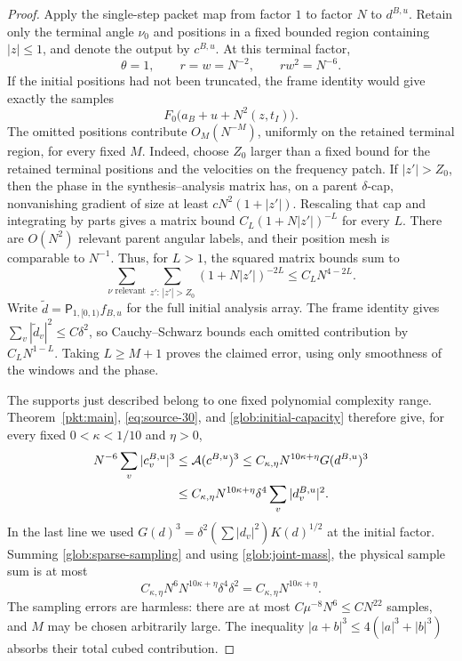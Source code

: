 \begin{proof}
Apply the single-step packet map from factor $1$ to factor $N$ to
$d^{B,u}$. Retain only the terminal angle $\nu_0$ and positions in a
fixed bounded region containing $|z|\le1$, and denote the output by
$c^{B,u}$. At this terminal factor,
\[
       \theta=1,\qquad r=w=N^{-2},\qquad rw^2=N^{-6}.
\]
If the initial positions had not been truncated, the frame identity
would give exactly the samples
\[
       F_0\bigl(a_B+u+N^2(z,t_I)\bigr).
\]
The omitted positions contribute $O_M(N^{-M})$, uniformly on the
retained terminal region, for every fixed $M$.
Indeed, choose $Z_0$ larger than a fixed bound for the retained terminal
positions and the velocities on the frequency patch. If $|z'|>Z_0$,
then the phase in the synthesis--analysis matrix has, on a parent
$\delta$-cap, nonvanishing gradient of size at least
$cN^2(1+|z'|)$. Rescaling that cap and integrating by parts gives a
matrix bound $C_L(1+N|z'|)^{-L}$ for every $L$. There are $O(N^2)$
relevant parent angular labels, and their position mesh is comparable
to $N^{-1}$. Thus, for $L>1$, the squared matrix bounds sum to
\[
 \sum_{\nu\text{ relevant}}\sum_{z':\,|z'|>Z_0}(1+N|z'|)^{-2L}
                         \le C_LN^{4-2L}.
\]
Write $\widetilde d=\mathsf P_{1,[0,1)}f_{B,u}$ for the full initial
analysis array. The frame identity gives
$\sum_v|\widetilde d_v|^2\le C\delta^2$, so Cauchy--Schwarz bounds
each omitted contribution by $C_LN^{1-L}$. Taking $L\ge M+1$ proves
the claimed error, using only smoothness of the windows and the phase.

The supports just described belong to one fixed polynomial complexity
range. Theorem~\ref{pkt:main}, \eqref{eq:source-30}, and
\eqref{glob:initial-capacity} therefore give, for every fixed
$0<\kappa<1/10$ and $\eta>0$,
\begin{align}
 N^{-6}\sum_v|c_v^{B,u}|^3
 &\le \mathcal A(c^{B,u})^3
 \le C_{\kappa,\eta}N^{10\kappa+\eta}G(d^{B,u})^3 \notag\\
 &\le C_{\kappa,\eta}N^{10\kappa+\eta}
                 \delta^4\sum_v|d_v^{B,u}|^2.
 \label{glob:sparse-sampling}
\end{align}
In the last line we used $G(d)^3=\delta^2(\sum|d_v|^2)K(d)^{1/2}$
at the initial factor. Summing \eqref{glob:sparse-sampling} and using
\eqref{glob:joint-mass}, the physical sample sum is at most
\[
 C_{\kappa,\eta}N^6N^{10\kappa+\eta}\delta^4\delta^2
                    =C_{\kappa,\eta}N^{10\kappa+\eta}.
\]
The sampling errors are harmless: there are at most
$C\mu^{-8}N^6\le CN^{22}$ samples, and $M$ may be chosen arbitrarily
large. The inequality $|a+b|^3\le4(|a|^3+|b|^3)$ absorbs their total
cubed contribution.


\end{proof}
